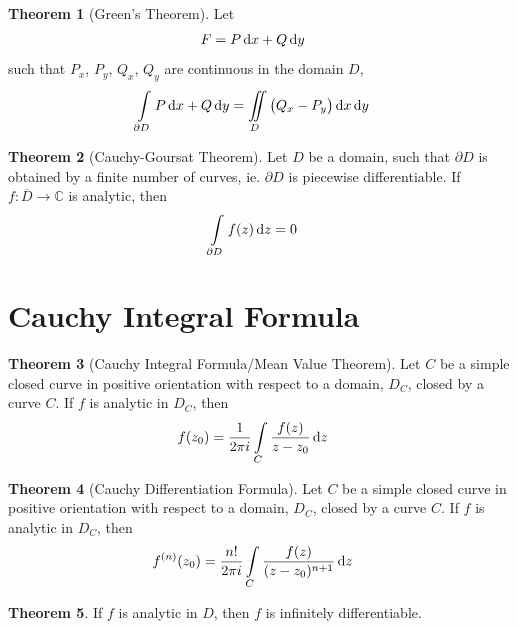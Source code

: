 \documentclass[titlepage, fleqn, a4paper, 12pt, twoside]{article}
\theoremstyle{definition}
\theoremstyle{theorem}
\newtheorem{theorem}{Theorem}
\begin{document}
\begin{theorem}[Green's Theorem]
	Let
	\begin{align*}
		F & = P \dif x + Q \dif y
	\end{align*}
	such that $P_x$, $P_y$, $Q_x$, $Q_y$ are continuous in the domain $D$,
	\begin{align*}
		\int\limits_{\partial D} P \dif x + Q \dif y & = \iint\limits_{D} \left( Q_x - P_y \right) \dif x \dif y
	\end{align*}
	\label{thm:Green's_Theorem}
\end{theorem}

\begin{theorem}[Cauchy-Goursat Theorem]
	Let $D$ be a domain, such that $\partial D$ is obtained by a finite number of curves, ie. $\partial D$ is piecewise differentiable.
	If $f : \overline{D} \to \mathbb{C}$ is analytic, then
	\begin{align*}
		\int\limits_{\partial D} f(z) \dif z & = 0
	\end{align*}
	\label{thm:Cauchy-Goursat_Theorem}
\end{theorem}

\section{Cauchy Integral Formula}

\begin{theorem}[Cauchy Integral Formula/Mean Value Theorem]
	Let $C$ be a simple closed curve in positive orientation with respect to a domain, $D_C$, closed by a curve $C$.
	If $f$ is analytic in $D_C$, then
	\begin{align*}
		f(z_0) & = \frac{1}{2 \pi i} \int\limits_{C} \frac{f(z)}{z - z_0} \dif z
	\end{align*}
	\label{thm:Cauchy_Integral_Formula/Mean_Value_Theorem}
\end{theorem}

\begin{theorem}[Cauchy Differentiation Formula]
	Let $C$ be a simple closed curve in positive orientation with respect to a domain, $D_C$, closed by a curve $C$.
	If $f$ is analytic in $D_C$, then
	\begin{align*}
		f^{(n)}(z_0) & = \frac{n!}{2 \pi i} \int\limits_{C} \frac{f(z)}{(z - z_0)^{n + 1}} \dif z
	\end{align*}
	\label{thm:Cauchy_Differentiation_Formula}
\end{theorem}

\begin{theorem}
	If $f$ is analytic in $D$, then $f$ is infinitely differentiable.
\end{theorem}
\end{document}
